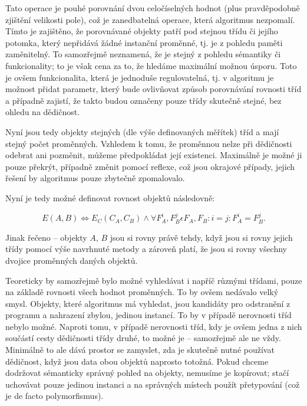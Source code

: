 Tato operace je pouhé porovnání dvou celočíselných hodnot (plus pravděpodobně zjištění velikosti pole), což je zanedbatelná operace, která algoritmus nezpomalí. Tímto je zajištěno, že porovnávané objekty patří pod stejnou třídu či jejího potomka, který nepřidává žádné instanční proměnné, tj. je z pohledu paměti zaměnitelný. To samozřejmě neznamená, že je stejný z pohledu sémantiky či funkcionality; to je však cena za to, že hledáme maximální možnou úsporu. Toto je ovšem funkcionalita, která je jednoduše regulovatelná, tj. v algoritmu je možnost přidat parametr, který bude ovlivňovat způsob porovnávání rovnosti tříd a případně zajistí, že takto budou označeny pouze třídy skutečně stejné, bez ohledu na dědičnost.

Nyní jsou tedy objekty stejných (dle výše definovaných měřítek) tříd a mají stejný počet proměnných. Vzhledem k tomu, že proměnnou nelze při dědičnosti odebrat ani pozměnit, můžeme předpokládat její existenci. Maximálně je možné ji pouze překrýt, případně změnit pomocí reflexe, což jsou okrajové případy, jejich řešení by algoritmus pouze zbytečně zpomalovalo.

Nyní je tedy možné definovat rovnost objektů následovně:

\begin{equation}
E(A, B) \Leftrightarrow E_C(C_A, C_B) \wedge \forall F_A^i, F_B^j \epsilon F_A, F_B: i = j: F_A^i = F_B^j.
\end{equation}

Jinak řečeno -- objekty $A$, $B$ jsou si rovny právě tehdy, když jsou si rovny jejich třídy pomocí výše navrhnuté metody a zároveň platí, že jsou si rovny všechny dvojice proměnných daných objektů. 

Teoreticky by samozřejmě bylo možné vyhledávat i napříč různými třídami, pouze na základě rovnosti všech hodnot proměnných. To by ovšem nedávalo velký smysl. Objekty, které algoritmus má vyhledat, jsou kandidáty pro odstranění z programu a nahrazení zbylou, jedinou instancí. To by v případě nerovnosti tříd nebylo možné. Naproti tomu, v případě nerovnosti tříd, kdy je ovšem jedna z nich součástí cesty dědičnosti třídy druhé, to možné je -- samozřejmě ale ne vždy. Minimálně to ale dává prostor se zamyslet, zda je skutečně nutné používat dědičnost, když jsou data obou objektů naprosto totožná. Pokud chceme dodržovat sémanticky správný pohled na objekty, nemusíme je kopírovat; stačí uchovávat pouze jedinou instanci a na správných místech použít přetypování (což je de facto polymorfismus).

